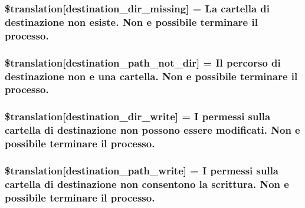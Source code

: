 \subsubsection[{\$translation}]{\setlength{\rightskip}{0pt plus 5cm}\$translation\mbox{[}\textquotesingle{}destination\+\_\+dir\+\_\+missing\textquotesingle{}\mbox{]} = \textquotesingle{}La cartella di destinazione non esiste. Non e possibile terminare il processo.\textquotesingle{}}\label{class_8upload_8it___i_t_8php_a9ef28d3cf09942c6c0a1e77fa09185e8}
\hypertarget{class_8upload_8it___i_t_8php_a5704a67137126e8c87b7a364175929d4}{}
\subsubsection[{\$translation}]{\setlength{\rightskip}{0pt plus 5cm}\$translation\mbox{[}\textquotesingle{}destination\+\_\+path\+\_\+not\+\_\+dir\textquotesingle{}\mbox{]} = \textquotesingle{}Il percorso di destinazione non e una cartella. Non e possibile terminare il processo.\textquotesingle{}}\label{class_8upload_8it___i_t_8php_a5704a67137126e8c87b7a364175929d4}
\hypertarget{class_8upload_8it___i_t_8php_a97608ea194a616db49141a0e6dee900c}{}
\subsubsection[{\$translation}]{\setlength{\rightskip}{0pt plus 5cm}\$translation\mbox{[}\textquotesingle{}destination\+\_\+dir\+\_\+write\textquotesingle{}\mbox{]} = \textquotesingle{}I permessi sulla cartella di destinazione non possono essere modificati. Non e possibile terminare il processo.\textquotesingle{}}\label{class_8upload_8it___i_t_8php_a97608ea194a616db49141a0e6dee900c}
\hypertarget{class_8upload_8it___i_t_8php_a40e4e1962226b89fd76da5819a9602b0}{}
\subsubsection[{\$translation}]{\setlength{\rightskip}{0pt plus 5cm}\$translation\mbox{[}\textquotesingle{}destination\+\_\+path\+\_\+write\textquotesingle{}\mbox{]} = \textquotesingle{}I permessi sulla cartella di destinazione non consentono la scrittura. Non e possibile terminare il processo.\textquotesingle{}}\label{class_8upload_8it___i_t_8php_a40e4e1962226b89fd76da5819a9602b0}
\hypertarget{class_8upload_8it___i_t_8php_a2baece8da11e20d45175db91851ec3e3}{}

